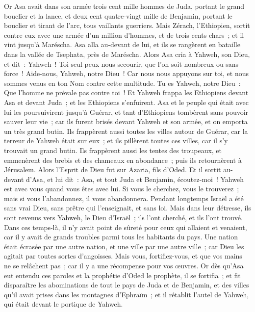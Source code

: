\begin{multicols}{2}
Or Asa avait dans son armée trois cent mille hommes de Juda, portant le grand bouclier et la lance, et deux cent quatre-vingt mille de Benjamin, portant le bouclier et tirant de l'arc, tous vaillants guerriers.
Mais Zérach, l'Ethiopien, sortit contre eux avec une armée d'un million d'hommes, et de trois cents chars~; et il vint jusqu'à Maréscha.
Asa alla au-devant de lui, et ils se rangèrent en bataille dans la vallée de Tsephata, près de Maréscha.
Alors Asa cria à Yahweh, son Dieu, et dit~: Yahweh~! Toi seul peux nous secourir, que l'on soit nombreux ou sans force~! Aide-nous, Yahweh, notre Dieu~! Car nous nous appuyons sur toi, et nous sommes venus en ton Nom contre cette multitude. Tu es Yahweh, notre Dieu~: Que l'homme ne prévale pas contre toi~!
Et Yahweh frappa les Ethiopiens devant Asa et devant Juda~; et les Ethiopiens s'enfuirent.
Asa et le peuple qui était avec lui les poursuivirent jusqu'à Guérar, et tant d'Ethiopiens tombèrent sans pouvoir sauver leur vie~; car ils furent brisés devant Yahweh et son armée, et on emporta un très grand butin.
Ils frappèrent aussi toutes les villes autour de Guérar, car la terreur de Yahweh était sur eux~; et ils pillèrent toutes ces villes, car il s'y trouvait un grand butin.
Ils frappèrent aussi les tentes des troupeaux, et emmenèrent des brebis et des chameaux en abondance~; puis ils retournèrent à Jérusalem.
\VerseOne{}Alors l'Esprit de Dieu fut sur Azaria, fils d'Oded.
Et il sortit au-devant d'Asa, et lui dit~: Asa, et tout Juda et Benjamin, écoutez-moi~! Yahweh est avec vous quand vous êtes avec lui. Si vous le cherchez, vous le trouverez~; mais si vous l'abandonnez, il vous abandonnera.
Pendant longtemps Israël a été sans vrai Dieu, sans prêtre qui l'enseignait, et sans loi.
Mais dans leur détresse, ils sont revenus vers Yahweh, le Dieu d'Israël~; ils l'ont cherché, et ils l'ont trouvé.
Dans ces temps-là, il n'y avait point de sûreté pour ceux qui allaient et venaient, car il y avait de grands troubles parmi tous les habitants du pays.
Une nation était écrasée par une autre nation, et une ville par une autre ville~; car Dieu les agitait par toutes sortes d'angoisses.
Mais vous, fortifiez-vous, et que vos mains ne se relâchent pas~; car il y a une récompense pour vos œuvres.
Or dès qu'Asa eut entendu ces paroles et la prophétie d'Oded le prophète, il se fortifia~; et fit disparaître les abominations de tout le pays de Juda et de Benjamin, et des villes qu'il avait prises dans les montagnes d'Ephraïm~; et il rétablit l'autel de Yahweh, qui était devant le portique de Yahweh.

\end{multicols}
